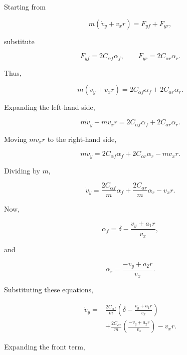 \documentclass[12pt,a4paper]{article}
\begin{document}
Starting from

\begin{equation}
m\left(\dot v_y+v_xr\right)
=
F_{yf}+F_{yr},
\end{equation}

substitute

\begin{equation}
F_{yf}=2C_{\alpha f}\alpha_f,
\qquad
F_{yr}=2C_{\alpha r}\alpha_r.
\end{equation}

Thus,

\begin{equation}
m\left(\dot v_y+v_xr\right)
=
2C_{\alpha f}\alpha_f
+
2C_{\alpha r}\alpha_r.
\end{equation}

Expanding the left-hand side,

\begin{equation}
m\dot v_y
+
mv_xr
=
2C_{\alpha f}\alpha_f
+
2C_{\alpha r}\alpha_r.
\end{equation}

Moving $mv_xr$ to the right-hand side,

\begin{equation}
m\dot v_y
=
2C_{\alpha f}\alpha_f
+
2C_{\alpha r}\alpha_r
-
mv_xr.
\end{equation}

Dividing by $m$,

\begin{equation}
\dot v_y
=
\frac{2C_{\alpha f}}{m}\alpha_f
+
\frac{2C_{\alpha r}}{m}\alpha_r
-
v_xr.
\end{equation}

Now,

\begin{equation}
\alpha_f
=
\delta
-
\frac{v_y+a_1r}{v_x},
\end{equation}

and

\begin{equation}
\alpha_r
=
\frac{-v_y+a_2r}{v_x}.
\end{equation}

Substituting these equations,

\begin{align}
\dot v_y
={}&
\frac{2C_{\alpha f}}{m}
\left(
\delta-\frac{v_y+a_1r}{v_x}
\right)
\nonumber\\
&+
\frac{2C_{\alpha r}}{m}
\left(
\frac{-v_y+a_2r}{v_x}
\right)
-v_xr.
\end{align}

Expanding the front term,
\end{document}

